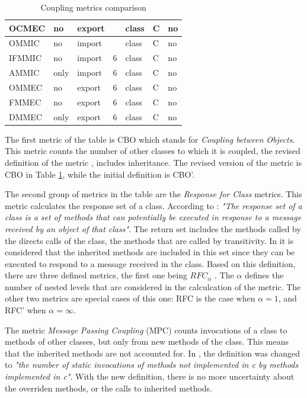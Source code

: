 \begin{table}[p]
\begin{center}
\begin{tabular}{|l|l|l|l|l|l|l|}
    OCMEC & no & export &  & class & C & no \\
    \hline
    OMMIC & no & import &  & class & C & no \\
    IFMMIC & no & import & 6 & class & C & no \\
    AMMIC & only & import & 6 & class & C & no \\
    OMMEC & no & export & 6 & class & C & no \\
    FMMEC & no & export & 6 & class & C & no \\
    DMMEC & only & export & 6 & class & C & no \\
    \hline
    \end{tabular}
    \end{center}
    \caption{Coupling metrics comparison}
    \label{table:coupling-metrics}
\end{table}

\bigskip\noindent
The first metric of the table is CBO which stands for \textit{Coupling between Objects}. This metric counts the number of other classes to which it is coupled, the revised definition of the metric \cite{chidamber1994metrics}, includes inheritance. The revised version of the metric is CBO in Table \ref{table:coupling-metrics}, while the initial definition is CBO'.

The second group of metrics in the table are the \textit{Response for Class} metrics. This metric calculates the response set of a class. According to \cite{chidamber1994metrics}: \textit{"The response set of a class is a set of methods that can potentially be executed in response to a message received by an object of that class"}. The return set includes the methods called by the directs calls of the class, the methods that are called by transitivity. In \cite{briand199unified} it is considered that the inherited methods are included in this set since they can be executed to respond to a message received in the class. Based on this definition, there are three defined metrics, the first one being $RFC_\alpha$ \cite{churcher1995towards}. The $\alpha$ defines the number of nested levels that are considered in the calculcation of the metric. The other two metrics are special cases of this one: RFC is the case when $\alpha = 1$, and RFC' when $\alpha = \infty$.

The metric \textit{Message Passing Coupling} (MPC) \cite{li1993object} counts invocations of a class to methods of other classes, but only from new methods of the class. This means that the inherited methods are not accounted for. In \cite{briand1999unified}, the definition was changed to \textit{"the number of static invocations of methods not implemented in c by methods implemented in c"}. With the new definition, there is no more uncertainty about the overriden methods, or the calls to inherited methods.

